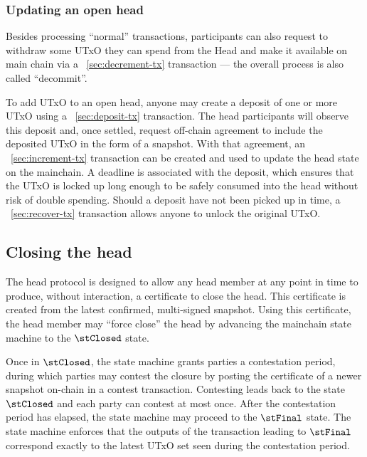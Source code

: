 \subsubsection{Updating an open head}

Besides processing ``normal'' transactions, participants can also request to
withdraw some UTxO they can spend from the Head and make it available on main
chain via a \mtxDecrement{}~\ref{sec:decrement-tx} transaction --- the overall
process is also called ``decommit''.

To add UTxO to an open head, anyone may create a deposit of one or more UTxO
using a \mtxDeposit{}~\ref{sec:deposit-tx} transaction. The head participants
will observe this deposit and, once settled, request off-chain agreement to
include the deposited UTxO in the form of a snapshot. With that agreement, an
\mtxIncrement{}~\ref{sec:increment-tx} transaction can be created and used to
update the head state on the mainchain. A deadline is associated with the
deposit, which ensures that the UTxO is locked up long enough to be safely
consumed into the head without risk of double spending. Should a deposit have
not been picked up in time, a \mtxRecover{}~\ref{sec:recover-tx} transaction
allows anyone to unlock the original UTxO.

\subsection{Closing the head}

The head protocol is designed to allow any head member at any point in time to
produce, without interaction, a certificate to close the head. This certificate
is created from the latest confirmed, multi-signed snapshot. Using this
certificate, the head member may ``force close'' the head by advancing the
mainchain state machine to the $\stClosed$ state.

Once in $\stClosed$, the state machine grants parties a contestation period,
during which parties may contest the closure by posting the certificate of a
newer snapshot on-chain in a contest transaction. Contesting leads back to the
state $\stClosed$ and each party can contest at most once. After the
contestation period has elapsed, the state machine may proceed to the $\stFinal$
state. The state machine enforces that the outputs of the transaction leading to
$\stFinal$ correspond exactly to the latest UTxO set seen during the
contestation period.

